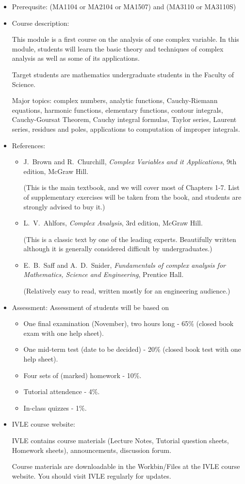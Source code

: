 \documentclass[a4paper]{article}
\begin{document}
\begin{itemize}
\item Prerequsite: (MA1104 or MA2104 or MA1507) and (MA3110 or MA3110S)
  
\item Course description:
  
  This module is a first course on the analysis of one complex variable. In this module, students will learn the basic theory and techniques of complex analysis as well as some of its applications.
  
  Target students are mathematics undergraduate students in the Faculty of Science.

  Major topics: complex numbers, analytic functions, Cauchy-Riemann equations, harmonic functions, elementary functions, contour integrals, Cauchy-Goursat Theorem, Cauchy integral formulas, Taylor series, Laurent series, residues and poles, applications to computation of improper
integrals.
  
\item References:
  \begin{itemize}
  \item 
    J.~Brown and R.~Churchill, \emph{Complex Variables and it Applications}, 9th edition, McGraw Hill.
    
    (This is the main textbook, and we will cover most of Chapters 1-7.  List of supplementary exercises will be taken from the book, and students are strongly advised to buy it.)
  \item 
    L.~V.~Ahlfors, \emph{Complex Analysis}, 3rd edition, McGraw Hill.

    (This is a classic text by one of the leading experts. Beautifully written although it is generally considered difficult by undergraduates.)
  \item
    E.~B.~Saff and A.~D.~Snider, \emph{Fundamentals of complex analysis for Mathematics, Science and Engineering}, Prentice Hall.
    
    (Relatively easy to read, written mostly for an engineering audience.)
  \end{itemize}
\item Assessment:
  Assessment of students will be based on
  \begin{itemize}
  \item
    One final examination (November), two hours long - 65\% (closed book exam with one help sheet).
  \item 
    One mid-term test (date to be decided) - 20\% (closed book test with one help sheet).
  \item 
    Four sets of (marked) homework - 10\%.
  \item 
    Tutorial attendence - 4\%.
  \item
    In-class quizzes - 1\%.
  \end{itemize}
\item
  IVLE course website:

  IVLE contains course materials (Lecture Notes, Tutorial question sheets, Homework sheets), announcements,  discussion forum.

  Course materials are downloadable in the Workbin/Files at the IVLE course website. You should visit IVLE regularly for updates.
\end{itemize}
\end{document}
